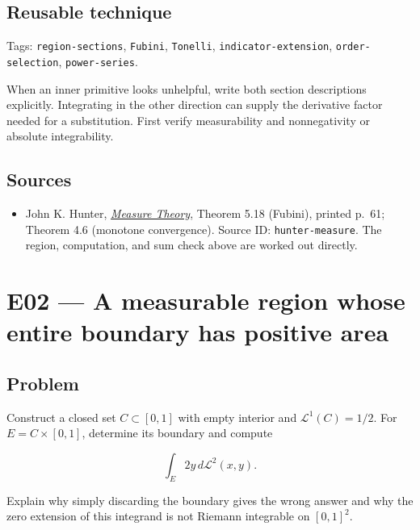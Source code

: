 \documentclass[
  11pt,
]{article}
\providecommand{\tightlist}{%
  \setlength{\itemsep}{0pt}\setlength{\parskip}{0pt}}
\begin{document}
\subsection{Reusable technique}\label{reusable-technique}

\begingroup\small\raggedright Tags: \texttt{region-\allowbreak{}sections}, \texttt{Fubini}, \texttt{Tonelli},
\texttt{indicator-\allowbreak{}extension}, \texttt{order-\allowbreak{}selection},
\texttt{power-\allowbreak{}series}.\par\endgroup

When an inner primitive looks unhelpful, write both section descriptions
explicitly. Integrating in the other direction can supply the derivative
factor needed for a substitution. First verify measurability and
nonnegativity or absolute integrability.

\subsection{Sources}\label{sources}

\begin{itemize}
\tightlist
\item
  John K. Hunter,
  \href{https://www.math.ucdavis.edu/~hunter/measure_theory/measure_notes.pdf}{\emph{Measure
  Theory}}, Theorem 5.18 (Fubini), printed p.~61; Theorem 4.6 (monotone
  convergence). Source ID: \texttt{hunter-\allowbreak{}measure}. The region,
  computation, and sum check above are worked out directly.
\end{itemize}

\section{E02 --- A measurable region whose entire boundary has positive
area}\label{E02}

\subsection{Problem}\label{problem-1}

Construct a closed set \(C\subset[0,1]\) with empty interior and
\(\mathcal L^1(C)=1/2\). For \(E=C\times[0,1]\), determine its boundary
and compute

\[
\int_E 2y\,d\mathcal L^2(x,y).
\]

Explain why simply discarding the boundary gives the wrong answer and
why the zero extension of this integrand is not Riemann integrable on
\([0,1]^2\).
\end{document}
